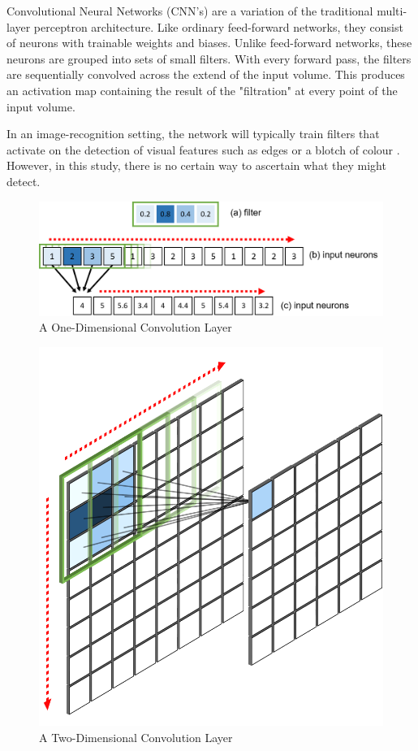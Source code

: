 \documentclass[11pt,oneside,openany,a4paper,english, report, goldenblock
]{usthesis}
\begin{document}
Convolutional Neural Networks (CNN's) are a variation of the traditional multi-layer perceptron architecture. Like ordinary feed-forward networks, they consist of neurons with trainable weights and biases. Unlike feed-forward networks, these neurons are grouped into sets of small filters. With every forward pass, the filters are sequentially convolved across the extend of the input volume. This produces an activation map containing the result of the "filtration" at every point of the input volume.

In an image-recognition setting, the network will typically train filters that activate on the detection of visual features such as edges or a blotch of colour \citep{cs231n}. However, in this study, there is no certain way to ascertain what they might detect.

\begin{figure}[h]
	\centering
	\includegraphics[width=0.9\linewidth]{1D_Convolution}
	\caption[1D Convolutional Layer]{A One-Dimensional Convolution Layer}
	\label{fig:1dconvolution}
\end{figure}

\begin{figure}[h]
	\centering
	\includegraphics[width=0.4\linewidth]{2D_Convolution}
	\caption[2D Convolution Layer]{A Two-Dimensional Convolution Layer}
	\label{fig:2dconvolution}
\end{figure}
\end{document}
